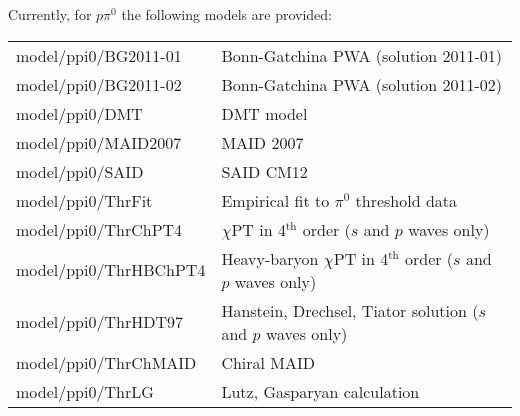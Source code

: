\documentclass[a4paper,10pt]{article}
\def\tt{\ttfamily}
\def\rm{\rmfamily}
\begin{document}
Currently, for $p \pi^0$ the following models are provided: \vspace{-0.25em}\\
\begin{tabular}{ll}
\hspace{-0.5em}\tt model/ppi0/BG2011-01\rm & Bonn-Gatchina PWA (solution 2011-01) \cite{Model_BnGa} \vspace{-0.5em}\\
\hspace{-0.5em}\tt model/ppi0/BG2011-02\rm & Bonn-Gatchina PWA (solution 2011-02) \cite{Model_BnGa} \vspace{-0.5em}\\
\hspace{-0.5em}\tt model/ppi0/DMT\rm & DMT model \cite{Model_DMT} \vspace{-0.5em}\\
\hspace{-0.5em}\tt model/ppi0/MAID2007\rm & MAID 2007 \cite{Model_MAID} \vspace{-0.5em}\\
\hspace{-0.5em}\tt model/ppi0/SAID\rm & SAID CM12 \cite{Model_SAID} \vspace{-0.5em}\\
\hspace{-0.5em}\tt model/ppi0/ThrFit\rm & Empirical fit to $\pi^0$ threshold data \cite{PRL_pi0thres} \vspace{-0.5em}\\
\hspace{-0.5em}\tt model/ppi0/ThrChPT4\rm & $\chi$PT in 4$^\mathrm{th}$ order ($s$ and $p$ waves only)
\cite{Model_ChPT4}\vspace{-0.5em}\\
\hspace{-0.5em}\tt model/ppi0/ThrHBChPT4\rm & Heavy-baryon $\chi$PT in 4$^\mathrm{th}$ order ($s$ and $p$ waves only)
\cite{Model_ChPT4} \vspace{-0.5em}\\
\hspace{-0.5em}\tt model/ppi0/ThrHDT97\rm & Hanstein, Drechsel, Tiator solution ($s$ and $p$ waves only)
\cite{Model_HDT97}\vspace{-0.5em}\\
\hspace{-0.5em}\tt model/ppi0/ThrChMAID\rm & Chiral MAID \cite{Model_chiMAID} \vspace{-0.5em}\\
\hspace{-0.5em}\tt model/ppi0/ThrLG\rm & Lutz, Gasparyan calculation \cite{Model_LG} \vspace{-0.1em}\\
\end{tabular}
\end{document}
